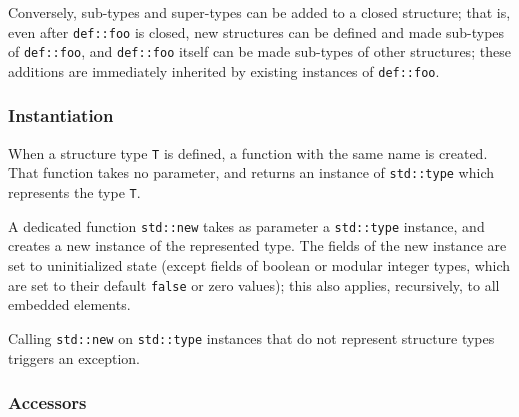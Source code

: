 Conversely, sub-types and super-types can be added to a closed
structure; that is, even after \verb|def::foo| is closed, new structures
can be defined and made sub-types of \verb|def::foo|, and
\verb|def::foo| itself can be made sub-types of other structures; these
additions are immediately inherited by existing instances of
\verb|def::foo|.

\subsubsection{Instantiation}

When a structure type \verb|T| is defined, a function with the same name
is created. That function takes no parameter, and returns an instance of
\verb|std::type| which represents the type \verb|T|.

A dedicated function \verb|std::new| takes as parameter a
\verb|std::type| instance, and creates a new instance of the represented
type. The fields of the new instance are set to uninitialized state
(except fields of boolean or modular integer types, which are set to
their default \verb|false| or zero values); this also applies,
recursively, to all embedded elements.

Calling \verb|std::new| on \verb|std::type| instances that do not
represent structure types triggers an exception.

\subsubsection{Accessors}

